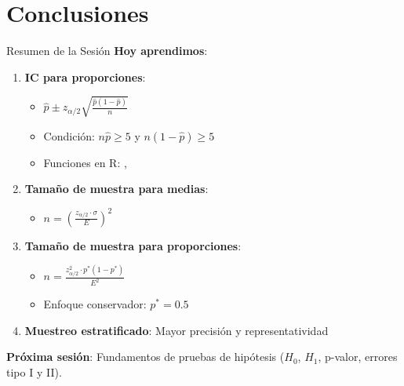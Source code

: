 \documentclass[aspectratio=169, 11pt]{beamer}
\begin{document}
\section{Conclusiones}

\begin{frame}{Resumen de la Sesión}
\textbf{Hoy aprendimos}:
\begin{enumerate}
  \item \textbf{IC para proporciones}:
  \begin{itemize}
    \item $\hat{p} \pm z_{\alpha/2} \sqrt{\frac{\hat{p}(1-\hat{p})}{n}}$
    \item Condición: $n\hat{p} \geq 5$ y $n(1-\hat{p}) \geq 5$
    \item Funciones en R: , 
  \end{itemize}

  \item \textbf{Tamaño de muestra para medias}:
  \begin{itemize}
    \item $n = \left(\frac{z_{\alpha/2} \cdot \sigma}{E}\right)^2$
  \end{itemize}

  \item \textbf{Tamaño de muestra para proporciones}:
  \begin{itemize}
    \item $n = \frac{z_{\alpha/2}^2 \cdot p^*(1-p^*)}{E^2}$
    \item Enfoque conservador: $p^* = 0.5$
  \end{itemize}

  \item \textbf{Muestreo estratificado}: Mayor precisión y representatividad
\end{enumerate}

\vspace{0.3cm}
\textbf{Próxima sesión}: Fundamentos de pruebas de hipótesis ($H_0$, $H_1$, p-valor, errores tipo I y II).
\end{frame}
\end{document}
